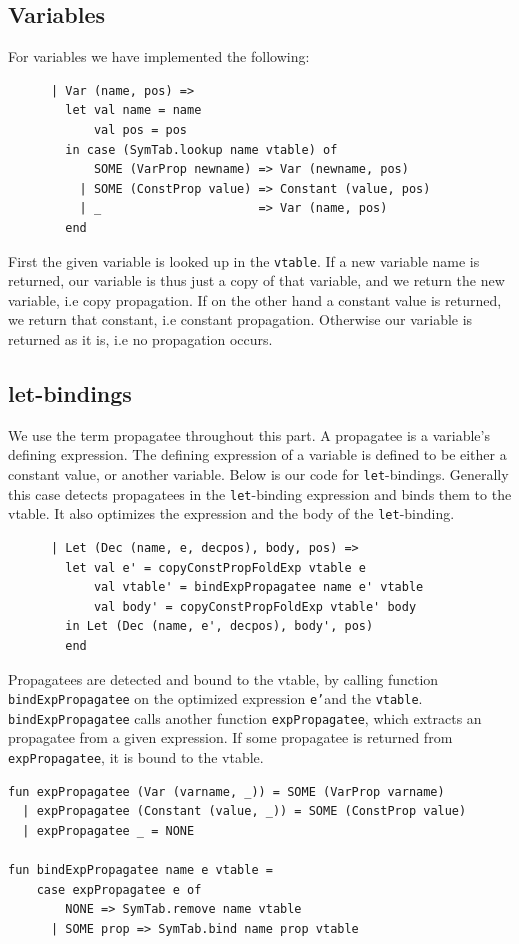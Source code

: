 \documentclass[11pt]{article}
\begin{document}
	\subsection{Variables}
	For variables we have implemented the following:
	\begin{lstlisting}
      | Var (name, pos) =>
        let val name = name
            val pos = pos
        in case (SymTab.lookup name vtable) of
            SOME (VarProp newname) => Var (newname, pos)
          | SOME (ConstProp value) => Constant (value, pos)
          | _                      => Var (name, pos)
        end
	\end{lstlisting}
	First the given variable is looked up in the \texttt{vtable}. If a new variable name is returned, our
	variable is thus just a copy of that variable, and we return the new variable, i.e copy propagation. If
	on the other hand a constant value is returned, we return that constant, i.e constant propagation.
	Otherwise our variable is returned as it is, i.e no propagation occurs.
	\subsection{let-bindings}
	We use the term propagatee throughout this part. A propagatee is a variable's defining expression. The
	defining expression of a variable is defined to be either a constant value, or another variable. Below is
	our code for \texttt{let}-bindings. Generally this case detects propagatees in the
	\texttt{let}-binding expression and binds them to the vtable. It also optimizes the expression and the
	body of the \texttt{let}-binding.
	\begin{lstlisting}
      | Let (Dec (name, e, decpos), body, pos) =>
        let val e' = copyConstPropFoldExp vtable e
            val vtable' = bindExpPropagatee name e' vtable
            val body' = copyConstPropFoldExp vtable' body
        in Let (Dec (name, e', decpos), body', pos)
        end
	\end{lstlisting}
	Propagatees are detected and bound to the vtable, by calling function \texttt{bindExpPropagatee} on the optimized expression
	\texttt{e'}and the \texttt{vtable}. \texttt{bindExpPropagatee} calls another function \texttt{expPropagatee}, which extracts
	an propagatee from a given expression. If some propagatee is returned from \texttt{expPropagatee}, it is bound to the vtable.
	\begin{lstlisting}
fun expPropagatee (Var (varname, _)) = SOME (VarProp varname)
  | expPropagatee (Constant (value, _)) = SOME (ConstProp value)
  | expPropagatee _ = NONE

fun bindExpPropagatee name e vtable =
    case expPropagatee e of
        NONE => SymTab.remove name vtable
      | SOME prop => SymTab.bind name prop vtable
	\end{lstlisting}
\end{document}
